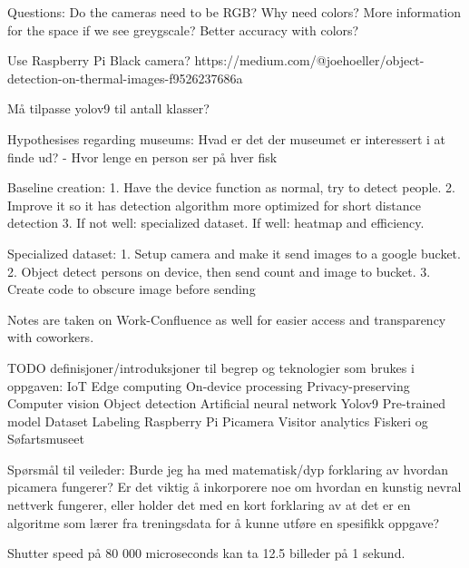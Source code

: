 Questions:
Do the cameras need to be RGB? Why need colors? More information for the space if we see greygscale? Better accuracy with colors?

Use Raspberry Pi Black camera?
https://medium.com/@joehoeller/object-detection-on-thermal-images-f9526237686a

Må tilpasse yolov9 til antall klasser?


Hypothesises regarding museums:
Hvad er det der museumet er interessert i at finde ud?
    - Hvor lenge en person ser på hver fisk




Baseline creation:
1. Have the device function as normal, try to detect people. 
2. Improve it so it has detection algorithm more optimized for short distance detection
3. If not well: specialized dataset. If well: heatmap and efficiency.

Specialized dataset:
1. Setup camera and make it send images to a google bucket. 
2. Object detect persons on device, then send count and image to bucket.
3. Create code to obscure image before sending


Notes are taken on Work-Confluence as well for easier access and transparency with coworkers. 



TODO definisjoner/introduksjoner til begrep og teknologier som brukes i oppgaven:
IoT
Edge computing
    On-device processing
    Privacy-preserving
Computer vision
Object detection
    Artificial neural network
    Yolov9
    Pre-trained model
    Dataset
    Labeling
Raspberry Pi
    Picamera
Visitor analytics
    Fiskeri og Søfartsmuseet

Spørsmål til veileder:
Burde jeg ha med matematisk/dyp forklaring av hvordan picamera fungerer?
Er det viktig å inkorporere noe om hvordan en kunstig nevral nettverk fungerer, eller holder det med en kort forklaring av at det er en algoritme som lærer fra treningsdata for å kunne utføre en spesifikk oppgave?

Shutter speed på 80 000 microseconds kan ta 12.5 billeder på 1 sekund. 
